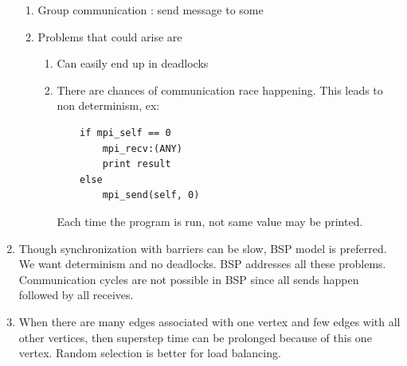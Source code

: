 \documentclass[twoside]{article}
\begin{document}
\begin{enumerate}
\begin{enumerate}
\item Group communication : send message to some
\item Problems that could arise are
\begin{enumerate}
\item Can easily end up in deadlocks
\item There are chances of communication race happening. This leads to non determinism, ex:
    \begin{verbatim}
    if mpi_self == 0
        mpi_recv:(ANY)
        print result
    else
        mpi_send(self, 0)
    \end{verbatim}
    Each time the program is run, not same value may be printed.
\end{enumerate}
\end{enumerate}
\item Though synchronization with barriers can be slow, BSP model is preferred. We want determinism and no deadlocks. BSP addresses all these problems. Communication cycles are not possible in BSP since all sends happen followed by all receives.
\item When there are many edges associated with one vertex and few edges with all other vertices, then superstep time can be prolonged because of this one vertex. Random selection is better for load balancing.
\end{enumerate}
\end{document}
